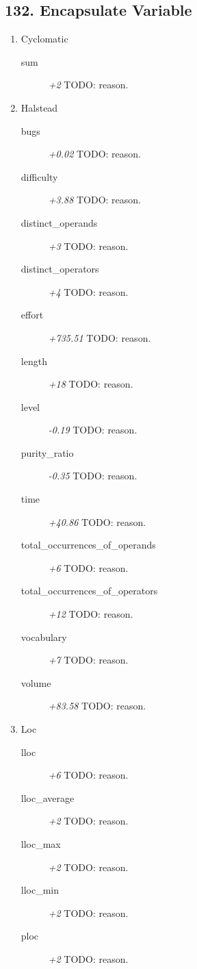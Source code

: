 \subsection{132. Encapsulate Variable}

\begin{enumerate}
  \item Cyclomatic
        \begin{description}
          \item [sum] \textit{+2} TODO: reason.
        \end{description}
  \item Halstead
        \begin{description}
          \item [bugs] \textit{+0.02} TODO: reason.
          \item [difficulty] \textit{+3.88} TODO: reason.
          \item [distinct\_operands] \textit{+3} TODO: reason.
          \item [distinct\_operators] \textit{+4} TODO: reason.
          \item [effort] \textit{+735.51} TODO: reason.
          \item [length] \textit{+18} TODO: reason.
          \item [level] \textit{-0.19} TODO: reason.
          \item [purity\_ratio] \textit{-0.35} TODO: reason.
          \item [time] \textit{+40.86} TODO: reason.
          \item [total\_occurrences\_of\_operands] \textit{+6} TODO: reason.
          \item [total\_occurrences\_of\_operators] \textit{+12} TODO: reason.
          \item [vocabulary] \textit{+7} TODO: reason.
          \item [volume] \textit{+83.58} TODO: reason.
        \end{description}
  \item Loc
        \begin{description}
          \item [lloc] \textit{+6} TODO: reason.
          \item [lloc\_average] \textit{+2} TODO: reason.
          \item [lloc\_max] \textit{+2} TODO: reason.
          \item [lloc\_min] \textit{+2} TODO: reason.
          \item [ploc] \textit{+2} TODO: reason.

\end{description}
\end{enumerate}
